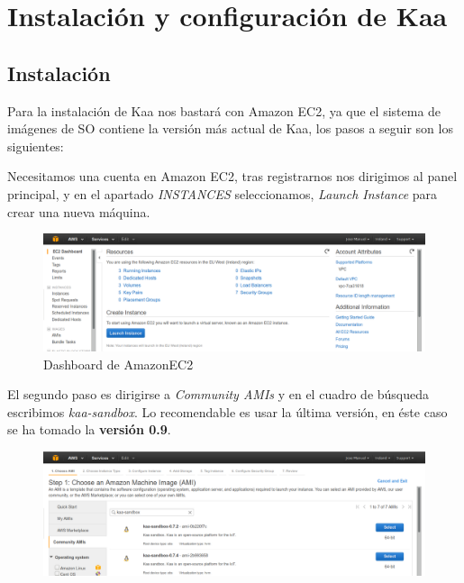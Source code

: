 \section{Instalación y configuración de Kaa}

\subsection{Instalación}

Para la instalación de Kaa nos bastará con Amazon EC2, ya que el sistema de imágenes de SO contiene la versión más actual de Kaa, los pasos a seguir son los siguientes:

Necesitamos una cuenta en Amazon EC2, tras registrarnos nos dirigimos al panel principal, y en el apartado \textit{INSTANCES} seleccionamos, \textit{Launch Instance} para crear una nueva máquina.

\begin{figure}[!ht]
  \begin{center}
    \includegraphics[scale=0.30]{../images/kaa/1.png}
		\caption{Dashboard de AmazonEC2}
    \label{fig:1}
	\end{center}
\end{figure}

\newpage

El segundo paso es dirigirse a \textit{Community AMIs} y en el cuadro de búsqueda escribimos \textit{kaa-sandbox}. Lo recomendable es usar la última versión, en éste caso se ha tomado la \textbf{versión 0.9}.

\begin{figure}[!ht]
  \begin{center}
    \includegraphics[scale=0.30]{../images/kaa/2.png}
		\caption{}
    \label{Instancias preconfiguradas de Kaa en EC2}
	\end{center}
\end{figure}

